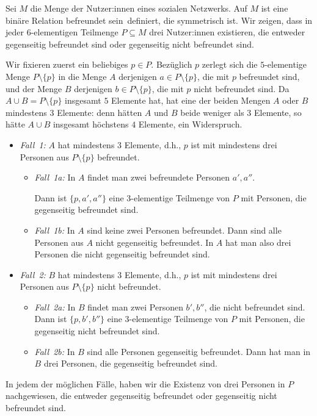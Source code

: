 \begin{bsp}
	Sei $M$ die Menge der Nutzer:innen eines sozialen Netzwerks. Auf $M$ ist eine binäre Relation \glqq befreundet sein\grqq\ definiert, die symmetrisch ist. Wir zeigen, dass in jeder $6$-elementigen Teilmenge $P \subseteq M$ drei Nutzer:innen existieren, die entweder gegenseitig befreundet sind oder gegenseitig nicht befreundet sind. 
	
	Wir fixieren zuerst ein beliebiges $p \in P$. Bezüglich $p$ zerlegt sich die $5$-elementige Menge $P \setminus \{p\}$ in die Menge $A$ derjenigen $a \in P \setminus \{p\}$, die mit $p$ befreundet sind, und der Menge $B$ derjenigen $b \in P \setminus \{p\}$, die mit $p$ nicht befreundet sind. Da $A \cup B = P \setminus \{p\}$ insgesamt $5$ Elemente hat, hat eine der beiden Mengen $A$ oder $B$ mindestens $3$ Elemente: denn hätten $A$ und $B$ beide weniger als $3$ Elemente, so hätte $A \cup B$ insgesamt höchstens $4$ Elemente, ein Widerspruch. 

	\begin{itemize} 
		\item[] \emph{Fall~1:} $A$ hat mindestens $3$ Elemente, d.h., $p$ ist mit mindestens drei Personen aus  $P \setminus \{p\}$ befreundet. 
		\begin{itemize} 
			\item[] \emph{Fall~1a:} In $A$ findet man zwei befreundete Personen $a', a''$.
			
			Dann ist $\{p,a',a''\}$ eine $3$-elementige Teilmenge von $P$ mit Personen, die gegenseitig befreundet sind. 
			\item[] \emph{Fall~1b:} In $A$ sind  keine zwei Personen befreundet. Dann sind alle Personen aus $A$ nicht gegenseitig befreundet. In $A$ hat man also drei Personen die nicht gegenseitig befreundet sind. 
		\end{itemize} 
		\item[] \emph{Fall~2:} $B$ hat mindestens $3$ Elemente, d.h., $p$ ist mit mindestens drei Personen aus $P \setminus \{p\}$ nicht befreundet. 
		\begin{itemize} 
				\item[] \emph{Fall~2a:} In $B$ findet man zwei Personen $b',b''$, die nicht befreundet sind. Dann ist $\{p,b',b''\}$ eine $3$-elementige Teilmenge von $P$ mit Personen, die gegenseitig nicht befreundet sind. 
				\item[] \emph{Fall~2b:} In $B$ sind alle Personen gegenseitig befreundet. Dann hat man in $B$ drei Personen, die gegenseitig befreundet sind. 
		\end{itemize} 
	\end{itemize} 
	In jedem der möglichen Fälle, haben wir die Existenz von drei Personen in $P$ nachgewiesen, die entweder gegenseitig befreundet oder gegenseitig nicht befreundet sind. 
\end{bsp} 

